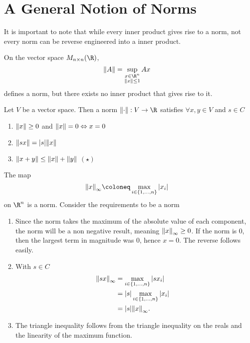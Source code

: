 \documentclass{subfiles}
\begin{document}
\section{A General Notion of Norms}

It is important to note that while every inner product gives rise to a norm, not every norm can be reverse engineered into a inner product.

\begin{example}
    On the vector space $M_{n\times n}(\R)$,
    \[
        \norm{A} = \sup_{\substack{x \in \R^n \\ \norm{x} \leq 1}} A x
    \]
    defines a norm, but there exists no inner product that gives rise to it.
\end{example}

\begin{definition}
    Let $V$ be a vector space. Then a norm $\norm{\cdot} : V \to \R$ satisfies $\forall x,y \in V$ and $s \in C$
    \begin{enumerate}
        \item $\norm{x} \geq 0$ and $\norm{x} = 0 \Leftrightarrow x = 0$
        \item $\norm{sx} = |s| \norm{x}$
        \item $\norm{x + y} \leq \norm{x} + \norm{y}$ \hfill $(\star)$
    \end{enumerate}
\end{definition}

\begin{example}
    The map
    \[
        \norm{x}_{\infty} \coloneq \max_{i \in \qty{1, \ldots, n}} |x_i|
    \]
    on $\R^n$ is a norm. Consider the requirements to be a norm
    \begin{enumerate}
        \item Since the norm takes the maximum of the absolute value of each component, the norm will be a non negative result, meaning $\norm{x}_{\infty} \geq 0$. If the norm is $0$, then the largest term in magnitude was $0$, hence $x = 0$. The reverse follows easily.
        \item With $s \in C$
            \begin{align*}
                \norm{sx}_{\infty} &= \max_{i \in \qty{1,\ldots,n}} |sx_i| \\
                &= |s| \max_{i \in \qty{1,\ldots,n}} |x_i| \\
                &= |s| \norm{x}_{\infty}.
            \end{align*}
        \item The triangle inequality follows from the triangle inequality on the reals and the linearity of the maximum function.
    \end{enumerate}
\end{example}
\end{document}

